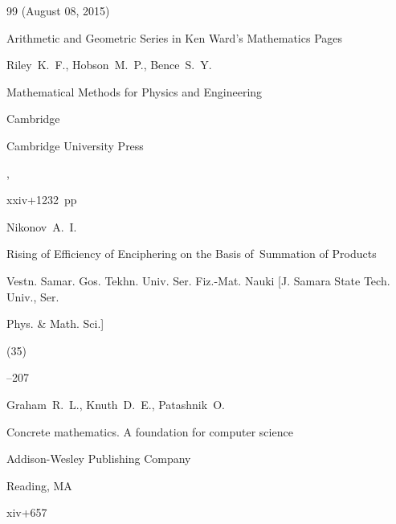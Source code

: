 \begin{thebibliography}{99}
(August 08, 2015)

\preprint  Arithmetic and Geometric Series in Ken Ward's Mathematics Pages








\by Riley~K.~F., Hobson~M.~P., Bence~S.~Y.

\book Mathematical Methods for Physics and Engi\-nee\-ring

\publaddr Cambridge

\publ Cambridge University Press

, 


xxiv+1232~pp





\by Nikonov~A.~I.

\paper Rising of Efficiency of Enciphering on the Basis of~Summation of Products

\jour Vestn. Samar. Gos. Tekhn. Univ. Ser. Fiz.-Mat. Nauki  \rm [J. Samara State Tech. Univ., Ser.

Phys. \& Math. Sci.]


(35)

--207





\by Graham~R.~L., Knuth~D.~E., Patashnik~O.

\book Concrete mathematics. A foundation for computer science

\publ Addison-Wesley Publishing Company

\publaddr Reading, MA


\totalpages xiv+657 





\end{thebibliography}





\EngDate



\newpage

\Russian





%


